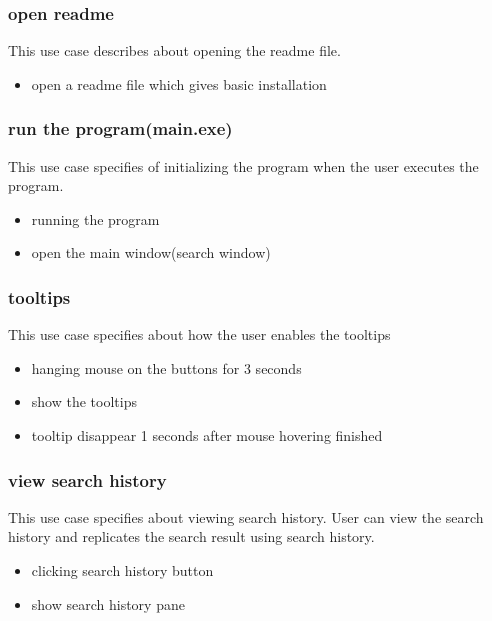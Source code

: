 \documentclass[conference]{IEEEtran}
\begin{document}
\subsubsection{open readme}
This use case describes about opening the readme file.
\begin{itemize}
  \item open a readme file which gives basic installation
\end{itemize}
\textit{}



\subsubsection{run the program(main.exe)}
This use case specifies of initializing the program when the user executes the program.
\begin{itemize}
  \item running the program
  \item open the main window(search window)
\end{itemize}
\textit{}



\subsubsection{tooltips}
This use case specifies about how the user enables the tooltips
\begin{itemize}
  \item hanging mouse on the buttons for 3 seconds
  \item show the tooltips
  \item tooltip disappear 1 seconds after mouse hovering finished
\end{itemize}
\textit{}

\subsubsection{view search history}
This use case specifies about viewing search history. User can view the search history and replicates the search result using search history.
\begin{itemize}
  \item clicking search history button
  \item show search history pane
\end{itemize}
\textit{}
\end{document}
